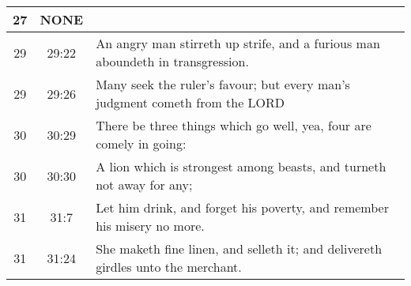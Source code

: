 \begin{center}
\begin{longtable}{c|c|p{3.5in}}
27 & \textbf{\textcolor[rgb]{0.00,1.00,0.00}{NONE}}  &\\ \hline
29 & 29:22 & An angry man stirreth up strife, and a furious man aboundeth in transgression.\\ 
29 & 29:26 & Many seek the ruler’s favour; but every man’s judgment cometh from the LORD\\ \hline
30 & 30:29 & There be three things which go well, yea, four are comely in going:\\ 
30 & 30:30 & A lion which is strongest among beasts, and turneth not away for any;\\ \hline
31 & 31:7 & Let him drink, and forget his poverty, and remember his misery no more.\\ 
31 & 31:24 & She maketh fine linen, and selleth it; and delivereth girdles unto the merchant.\\ 

\hline \hline



\end{longtable}
\end{center}


